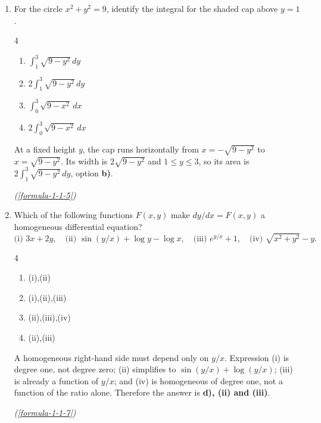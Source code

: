 \begin{enumerate}[label={},font=\normalfont,leftmargin=1.15cm,labelwidth=1.0cm,labelsep=0.15cm,itemindent=0pt,listparindent=0pt,itemsep=\baselineskip,parsep=0pt,topsep=0pt]
\item[3.1.12] For the circle $x^2+y^2=9$, identify the integral for the shaded cap above $y=1$.

\begin{multicols}{4}
\begin{enumerate}
\setlength{\itemsep}{0pt}
    \item $\int_1^3\sqrt{9-y^2}\,dy$
    \item $2\int_1^3\sqrt{9-y^2}\,dy$
    \item $\int_0^3\sqrt{9-x^2}\,dx$
    \item $2\int_0^3\sqrt{9-x^2}\,dx$
\end{enumerate}
\end{multicols}

\vspace{0.6em}\par\solution


At a fixed height $y$, the cap runs horizontally from $x=-\sqrt{9-y^2}$ to $x=\sqrt{9-y^2}$. Its width is $2\sqrt{9-y^2}$ and $1\le y\le3$, so its area is $\boxed{2\int_1^3\sqrt{9-y^2}\,dy}$, option \textbf{b)}.\par\noindent\hfill\mbox{\textit{(\ref{formula-1-1-5})}}\par

\item[3.1.13] Which of the following functions $F(x,y)$ make $dy/dx=F(x,y)$ a homogeneous differential equation?
\[
\text{(i) }3x+2y,\quad \text{(ii) }\sin(y/x)+\log y-\log x,\quad
\text{(iii) }e^{y/x}+1,\quad \text{(iv) }\sqrt{x^2+y^2}-y.
\]
\begin{multicols}{4}
\begin{enumerate}
\setlength{\itemsep}{0pt}
    \item (i),(ii)
    \item (i),(ii),(iii)
    \item (ii),(iii),(iv)
    \item (ii),(iii)
\end{enumerate}
\end{multicols}

\vspace{0.6em}\par\solution


A homogeneous right-hand side must depend only on $y/x$. Expression (i) is degree one, not degree zero; (ii) simplifies to $\sin(y/x)+\log(y/x)$; (iii) is already a function of $y/x$; and (iv) is homogeneous of degree one, not a function of the ratio alone. Therefore the answer is \textbf{d), (ii) and (iii)}.\par\noindent\hfill\mbox{\textit{(\ref{formula-1-1-7})}}\par


\end{enumerate}
